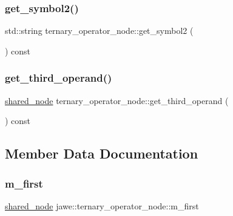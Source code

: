 \subsubsection{\texorpdfstring{get\+\_\+symbol2()}{get\_symbol2()}}
{\footnotesize\ttfamily std\+::string ternary\+\_\+operator\+\_\+node\+::get\+\_\+symbol2 (\begin{DoxyParamCaption}{ }\end{DoxyParamCaption}) const}

\mbox{\label{classjawe_1_1ternary__operator__node_a11d4425ca8009b87e05cb2da8785eb43}} 
\subsubsection{\texorpdfstring{get\+\_\+third\+\_\+operand()}{get\_third\_operand()}}
{\footnotesize\ttfamily \hyperlink{namespacejawe_a3f307481d921b6cbb50cc8511fc2b544}{shared\+\_\+node} ternary\+\_\+operator\+\_\+node\+::get\+\_\+third\+\_\+operand (\begin{DoxyParamCaption}{ }\end{DoxyParamCaption}) const}



\subsection{Member Data Documentation}
\mbox{\label{classjawe_1_1ternary__operator__node_ae2fd63c5210043d553c27e3f6aae5462}} 
\subsubsection{\texorpdfstring{m\+\_\+first}{m\_first}}
{\footnotesize\ttfamily \hyperlink{namespacejawe_a3f307481d921b6cbb50cc8511fc2b544}{shared\+\_\+node} jawe\+::ternary\+\_\+operator\+\_\+node\+::m\+\_\+first\hspace{0.3cm}{\ttfamily [private]}}

